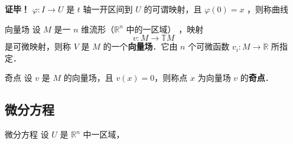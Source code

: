 \textbf{证毕！}
 $\varphi:I\rightarrow U$ 是 $t$ 轴一开区间到 $U$ 的可谓映射，且 $\varphi(0)=x$ ，则称曲线


\begin{definition}{向量场}
设 $M$ 是一 $n$ 维流形（$\mathbb R^n$ 中的一区域） ，映射
\begin{equation}
v:M\rightarrow\mathbb TM
\end{equation}
是可微映射，则称 $V$ 是 $M$ 的一个\textbf{向量场}．它由 $n$ 个可微函数 $v_i:M\rightarrow \mathbb R$ 所指定． 
\end{definition}
\begin{definition}{奇点}
设 $v$ 是 $M$ 的向量场，且 $v(x)=0$，则称点 $x$ 为向量场 $v$ 的\textbf{奇点}．
\end{definition}
\subsection{微分方程}
\begin{definition}{微分方程}
设 $U$ 是 $\mathbb R^n$ 中一区域，
\end{definition}


